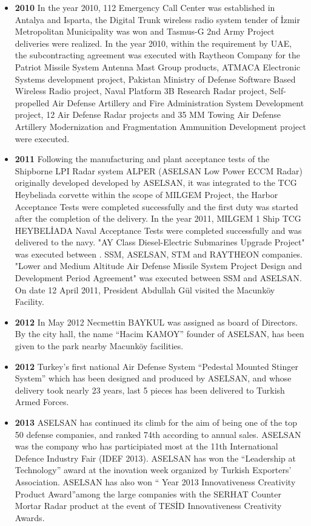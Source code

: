 \begin{itemize}
\item \textbf{ 2010 }
\subitem In the year 2010, 112 Emergency Call Center was established in Antalya and Isparta, the Digital Trunk wireless radio system tender of İzmir Metropolitan Municipality was won and Tasmus-G 2nd Army Project deliveries were realized.
\subitem In the year 2010, within the requirement by UAE, the subcontracting agreement was executed with Raytheon Company for the Patriot Missile System Antenna Mast Group products, ATMACA Electronic Systems development project, Pakistan Ministry of Defense Software Based Wireless Radio project, Naval Platform 3B Research Radar project, Self-propelled Air Defense Artillery and Fire Administration System Development project, 12 Air Defense Radar projects and 35 MM Towing Air Defense Artillery Modernization and Fragmentation Ammunition Development project were executed.
\item \textbf{ 2011 }
\subitem Following the manufacturing and plant acceptance tests of the Shipborne LPI Radar system ALPER (ASELSAN Low Power ECCM Radar) originally developed developed by ASELSAN, it was integrated to the TCG Heybeliada corvette within the scope of MILGEM Project, the Harbor Acceptance Tests were completed successfully and the first duty was started after the completion of the delivery.
\subitem In the year 2011, MILGEM 1 Ship TCG HEYBELİADA Naval Acceptance Tests were completed successfully and was delivered to the navy. "AY Class Diesel-Electric Submarines Upgrade Project" was executed between . SSM, ASELSAN, STM and RAYTHEON companies. "Lower and Medium Altitude Air Defense Missile System Project Design and Development Period Agreement" was executed between SSM and ASELSAN. On date 12 April 2011, President Abdullah Gül visited the Macunköy Facility.
\item \textbf{ 2012 }
\subitem In May 2012 Necmettin BAYKUL was assigned as board of Directors. By the city hall, the name “Hacim KAMOY” founder of ASELSAN, has been given to the park nearby Macunköy facilities.
\item \textbf{  2012 }
\subitem Turkey’s first national Air Defense System “Pedestal Mounted Stinger System” which has been designed and produced by ASELSAN, and whose delivery took nearly 23 years, last 5 pieces has been delivered to Turkish Armed Forces.
\item \textbf{ 2013 }
\subitem ASELSAN has continued its climb for the aim of being one of the top 50 defense companies, and ranked 74th according to annual sales.
\subitem ASELSAN was the company who has participiated most at the 11th International Defence Industry Fair (IDEF 2013).	
\subitem ASELSAN has won the “Leadership at Technology” award at the inovation week organized by Turkish Exporters’ Association. ASELSAN has also won “ Year 2013 Innovativeness Creativity Product Award”among the large companies with the SERHAT Counter Mortar Radar product at the event of TESİD Innovativeness Creativity Awards.​
\subitem 



\end{itemize}

